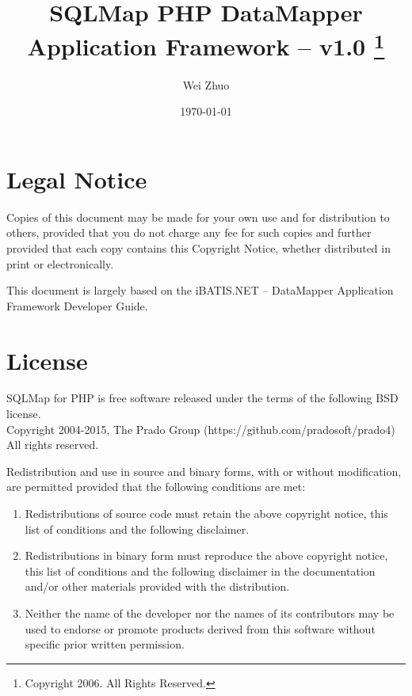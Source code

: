 \documentclass{book}
\title{\Huge \bfseries SQLMap PHP DataMapper Application Framework --
v1.0
    \thanks{Copyright 2006. All Rights Reserved.}
}
\author{Wei Zhuo}
\date{\today}
\begin{document}
\maketitle

\pagestyle{plain}
\tableofcontents

\chapter*{Legal Notice}

Copies of this document may be made for your own use and for distribution to
others, provided that you do not charge any fee for such copies and further
provided that each copy contains this Copyright Notice, whether distributed in
print or electronically.

This document is largely based on the iBATIS.NET -- DataMapper Application
Framework Developer Guide.

\chapter*{License}
SQLMap for PHP is free software released under the terms of the following BSD license.\\
Copyright 2004-2015, The Prado Group (https://github.com/pradosoft/prado4)\\
All rights reserved.

Redistribution and use in source and binary forms, with or without
modification, are permitted provided that the following conditions are met:
\begin{enumerate}
    \item Redistributions of source code must retain the above copyright notice,
this list of conditions and the following disclaimer.

 \item Redistributions in binary form must reproduce the above copyright notice,
this list of conditions and the following disclaimer in the documentation
and/or other materials provided with the distribution.

\item Neither the name of the developer nor the names of its contributors may
be used to endorse or promote products derived from this software without
specific prior written permission.
\end{enumerate}
\end{document}
